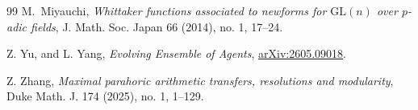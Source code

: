 \documentclass[11pt, a4paper]{amsart}
\newcommand{\GL}{{\mathrm{GL}}}
\theoremstyle{plain}
\theoremstyle{plain}
\theoremstyle{plain}
\theoremstyle{plain}
\theoremstyle{remark}
\theoremstyle{definition}
\theoremstyle{plain}
\numberwithin{equation}{section}
\begin{document}
\begin{thebibliography}{99}
M.~Miyauchi,
\emph{Whittaker functions associated to newforms for $\GL(n)$ over $p$-adic fields},
J. Math. Soc. Japan 66 (2014), no. 1, 17--24.

Z. Yu, and L. Yang, {\it Evolving Ensemble of Agents}, 
\href{https://arxiv.org/abs/2605.09018v4}{arXiv:2605.09018}.

Z. Zhang,
{\it Maximal parahoric arithmetic transfers, resolutions and modularity},
Duke Math. J. 174 (2025), no. 1, 1--129.



\end{thebibliography}
\end{document}

